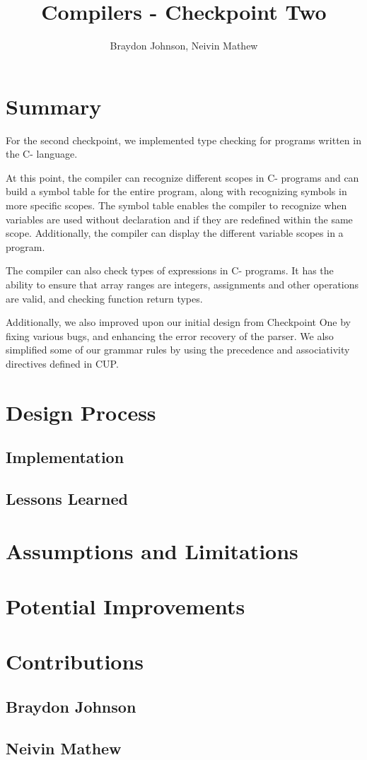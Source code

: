 \documentclass[12pt, letterpaper]{article}
\title{Compilers - Checkpoint Two}
\author{Braydon Johnson, Neivin Mathew}
\begin{document}
\maketitle

\section{Summary}
For the second checkpoint, we implemented type checking for programs written in the C- language.

At this point, the compiler can recognize different scopes in C- programs and can build a symbol table for the entire program, along with recognizing symbols in more specific scopes. The symbol table enables the compiler to recognize when variables are used without declaration and if they are redefined within the same scope. Additionally, the compiler can display the different variable scopes in a program.

The compiler can also check types of expressions in C- programs. It has the ability to ensure that array ranges are integers, assignments and other operations are valid, and checking function return types.

Additionally, we also improved upon our initial design from Checkpoint One by fixing various bugs, and enhancing the error recovery of the parser. We also simplified some of our grammar rules by using the precedence and associativity directives defined in CUP.

\section{Design Process}
\subsection{Implementation}
\subsection{Lessons Learned}

\section{Assumptions and Limitations}

\section{Potential Improvements}

\section{Contributions}
\subsection{Braydon Johnson}
\subsection{Neivin Mathew}
\end{document}
